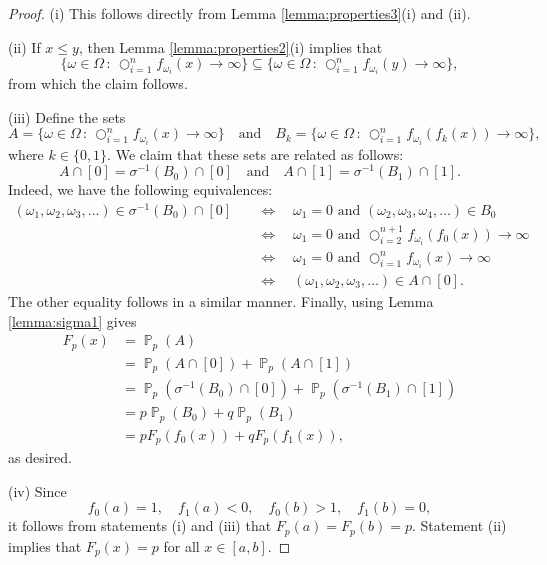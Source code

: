 \documentclass[a4paper,12pt]{article}
\DeclareMathOperator{\prob}{\mathbb{P}}
\DeclareMathOperator{\bigcomp}{\bigcirc}
\begin{document}
\begin{proof}
(i) This follows directly from Lemma \ref{lemma:properties3}(i) and (ii).

(ii) If $x \leq y$, then Lemma \ref{lemma:properties2}(i) implies that
\[
\{ \omega \in \Omega \,:\, \bigcomp_{i=1}^n f_{\omega_i}(x) \to \infty \}
	\subseteq
	\{ \omega \in \Omega \,:\, \bigcomp_{i=1}^n f_{\omega_i}(y) \to \infty \},
\]
from which the claim follows.

(iii) Define the sets
\[
A = \{ \omega \in \Omega \,:\, \bigcomp_{i=1}^n f_{\omega_i}(x) \to \infty \}
\quad\text{and}\quad
B_k = \{ \omega \in \Omega \,:\, \bigcomp_{i=1}^n f_{\omega_i}(f_k(x)) \to \infty \},
\]
where $k \in \{0,1\}$. We claim that these sets are related as follows:
\[
A \cap [0] = \sigma^{-1}(B_0) \cap [0]
\quad\text{and}\quad
A \cap [1] = \sigma^{-1}(B_1) \cap [1].
\]
Indeed, we have the following equivalences:
\[
\begin{split}
(\omega_1,\omega_2,\omega_3,\dots) \in \sigma^{-1}(B_0) \cap [0]
	& \quad\Leftrightarrow\quad \omega_1 = 0 \text{ and } (\omega_2,\omega_3,\omega_4,\dots) \in B_0 \\
	& \quad\Leftrightarrow\quad \omega_1 = 0 \text{ and } \bigcomp_{i=2}^{n+1} f_{\omega_i}(f_0(x)) \to \infty \\
	& \quad\Leftrightarrow\quad \omega_1 = 0 \text{ and } \bigcomp_{i=1}^{n} f_{\omega_i}(x) \to \infty \\
	& \quad\Leftrightarrow\quad (\omega_1,\omega_2,\omega_3,\dots) \in A \cap [0].
\end{split}
\]
The other equality follows in a similar manner. Finally, using Lemma \ref{lemma:sigma1} gives
\[
\begin{split}
F_p(x)
	& = \prob_p(A) \\
	& = \prob_p(A \cap [0]) + \prob_p(A \cap [1]) \\
	& = \prob_p(\sigma^{-1}(B_0) \cap [0]) + \prob_p(\sigma^{-1}(B_1) \cap [1]) \\
	& = p\prob_p(B_0) + q\prob_p(B_1) \\
	& = pF_p(f_0(x)) + qF_p(f_1(x)),
\end{split}
\]
as desired.

(iv) Since
\[
f_0(a)=1, \quad
f_1(a)<0, \quad
f_0(b)>1, \quad
f_1(b)=0,
\]
it follows from statements (i) and (iii) that $F_p(a) = F_p(b) = p$. Statement (ii) implies that $F_p(x)=p$ for all $x \in [a,b]$.


\end{proof}
\end{document}
